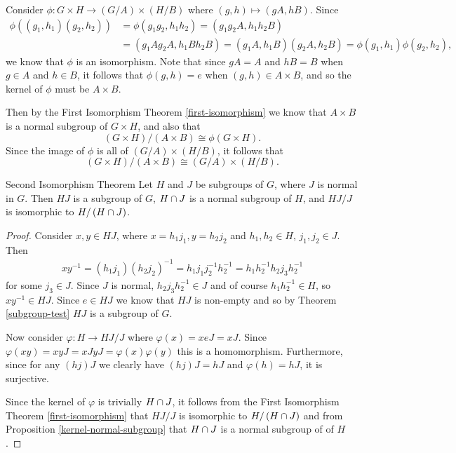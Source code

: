 \begin{exmp}
    Consider $\phi: G \times H \to \left(G/A\right) \times \left(H/B\right)$ where $(g, h) \mapsto (gA, hB)$. Since
    \begin{align*}
        \phi\left((g_1, h_1)(g_2, h_2)\right) &= \phi(g_1g_2, h_1h_2) = \left(g_1g_2A, h_1h_2B\right) \\
        &= \left(g_1Ag_2A, h_1Bh_2B\right) = (g_1A, h_1B)(g_2A, h_2B) = \phi(g_1, h_1)\phi(g_2, h_2),\
    \end{align*}
    we know that $\phi$ is an isomorphism. Note that since $gA = A$ and $hB = B$ when $g \in A$ and $h \in B$, it follows that $\phi(g, h) = e$ when $(g, h) \in A \times B$, and so the kernel of $\phi$ must be $A \times B.$

    Then by the First Isomorphism Theorem \ref{first-isomorphism} we know that $A \times B$ is a normal subgroup of $G \times H$, and also that
    \[\left(G \times H\right)/\left(A \times B\right) \cong \phi(G \times H).\] Since the image of $\phi$ is all of $\left(G/A\right) \times \left(H/B\right)$, it follows that
    \[\left(G \times H\right)/\left(A \times B\right) \cong \left(G/A\right) \times \left(H/B\right).\]
\end{exmp}

\begin{thm}Second Isomorphism Theorem\label{second-isomorphism}\proofbreak
    Let $H$ and $J$ be subgroups of $G$, where $J$ is normal in $G$. Then $HJ$ is a subgroup of $G$, $H \cap J$ is a normal subgroup of $H$, and $HJ/J$ is isomorphic to $H/\left(H \cap J\right)$.
\end{thm}

\begin{proof}
    Consider $x, y \in HJ$, where $x = h_1j_1, y = h_2j_2$ and $h_1,h_2 \in H$, $j_1,j_2 \in J$. Then
    \begin{align*}
        xy^{-1} = \left(h_1j_1\right)\left(h_2j_2\right)^{-1} = h_1j_1j_2^{-1}h_2^{-1} = h_1h_2^{-1}h_2j_3h_2^{-1}
    \end{align*} for some $j_3 \in J$. Since $J$ is normal, $h_2j_3h_2^{-1} \in J$ and of course $h_1h_2^{-1} \in H$, so $xy^{-1} \in HJ$. Since $e \in HJ$ we know that $HJ$ is non-empty and so by Theorem \ref{subgroup-test} $HJ$ is a subgroup of $G$.

    Now consider $\varphi: H \to HJ/J$ where $\varphi(x) = xeJ = xJ$. Since $\varphi(xy) = xyJ = xJyJ = \varphi(x)\varphi(y)$ this is a homomorphism. Furthermore, since for any $(hj)J$ we clearly have $(hj)J = hJ$ and $\varphi(h) = hJ$, it is surjective.

    Since the kernel of $\varphi$ is trivially $H \cap J$, it follows from the First Isomorphism Theorem \ref{first-isomorphism} that $HJ/J$ is isomorphic to $H/\left(H \cap J\right)$ and from Proposition \ref{kernel-normal-subgroup} that $H \cap J$ is a normal subgroup of of $H$.
\end{proof}

